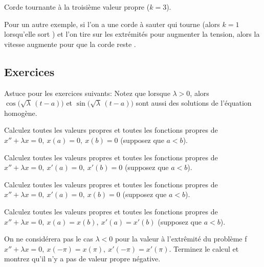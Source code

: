 \begin{myfig}
\capstart
{}
\caption{Corde tournante à la troisième valeur propre ($k=3$).\label{bvp:whirstring2fig}}
\end{myfig}

Pour un autre exemple, si l'on a une corde à sauter qui tourne (alors $k=1$ lorsqu'elle sort ) et l'on tire sur les extrémités pour augmenter la tension, alors la vitesse augmente pour que la corde reste .
 

\subsection{Exercices}

Astuce pour les exercices suivants:  Notez que lorsque  $\lambda > 0$, alors
$\cos \bigl( \sqrt{\lambda}\, (t - a) \bigr)$
et $\sin  \bigl( \sqrt{\lambda}\, (t - a) \bigr)$
sont aussi des solutions de l'équation homogène. 

\begin{exercise}
Calculez toutes les valeurs propres et toutes les fonctions propres de 
$x'' + \lambda x = 0, ~ x(a) = 0, ~ x(b) = 0$ (supposez que $a < b$).
\end{exercise}

\begin{exercise}
Calculez toutes les valeurs propres et toutes les fonctions propres de 
$x'' + \lambda x = 0, ~ x'(a) = 0, ~ x'(b) = 0$ (supposez que $a < b$).
\end{exercise}

\begin{exercise}
Calculez toutes les valeurs propres et toutes les fonctions propres de 
$x'' + \lambda x = 0, ~ x'(a) = 0, ~ x(b) = 0$ (supposez que $a < b$).
\end{exercise}

\begin{exercise}
Calculez toutes les valeurs propres et toutes les fonctions propres de 
$x'' + \lambda x = 0, ~ x(a) = x(b), ~ x'(a) = x'(b)$ (supposez que $a < b$).
\end{exercise}

\begin{exercise}
On ne considérera pas le cas  $\lambda < 0$ pour la valeur à l'extrêmité du problème f
$x'' + \lambda x = 0, ~ x(-\pi) = x(\pi), ~ x'(-\pi) = x'(\pi)$.
Terminez le calcul et montrez qu'il n'y a pas de valeur propre négative. 
\end{exercise}

